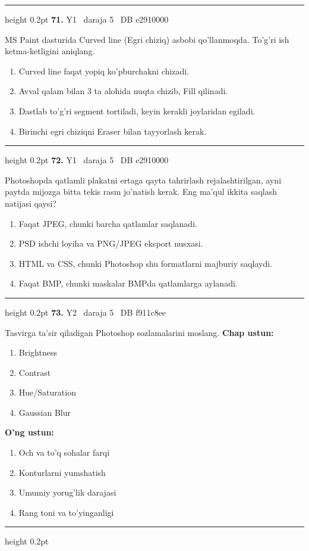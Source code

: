 \documentclass[10pt,a4paper,oneside]{article}
\begin{document}
\vspace{2mm}\hrule height 0.2pt \vspace{4mm}
\hypertarget{q71}{\textbf{\color{ink}71.}}  {\color{muted}\scriptsize Y1 \textbullet\ daraja 5 \textbullet\ DB e2910000}
\par
MS Paint dasturida Curved line (Egri chiziq) asbobi qo'llanmoqda. To'g'ri ish ketma-ketligini aniqlang.
\begin{enumerate}[label=\Alph*),leftmargin=9mm]
\item Curved line faqat yopiq ko'pburchakni chizadi.
\item Avval qalam bilan 3 ta alohida nuqta chizib, Fill qilinadi.
\item Dastlab to'g'ri segment tortiladi, keyin kerakli joylaridan egiladi.
\item Birinchi egri chiziqni Eraser bilan tayyorlash kerak.
\end{enumerate}
\vspace{2mm}\hrule height 0.2pt \vspace{4mm}
\hypertarget{q72}{\textbf{\color{ink}72.}}  {\color{muted}\scriptsize Y1 \textbullet\ daraja 5 \textbullet\ DB e2910000}
\par
Photoshopda qatlamli plakatni ertaga qayta tahrirlash rejalashtirilgan, ayni paytda mijozga bitta tekis rasm jo'natish kerak. Eng ma'qul ikkita saqlash natijasi qaysi?
\begin{enumerate}[label=\Alph*),leftmargin=9mm]
\item Faqat JPEG, chunki barcha qatlamlar saqlanadi.
\item PSD ishchi loyiha va PNG/JPEG eksport nusxasi.
\item HTML va CSS, chunki Photoshop shu formatlarni majburiy saqlaydi.
\item Faqat BMP, chunki maskalar BMPda qatlamlarga aylanadi.
\end{enumerate}
\vspace{2mm}\hrule height 0.2pt \vspace{4mm}
\hypertarget{q73}{\textbf{\color{ink}73.}}  {\color{muted}\scriptsize Y2 \textbullet\ daraja 5 \textbullet\ DB f911c8ee}
\par
Tasvirga ta'sir qiladigan Photoshop sozlamalarini moslang.
\textbf{\footnotesize Chap ustun:}
\begin{enumerate}[label=\arabic*),leftmargin=9mm]
\item Brightness
\item Contrast
\item Hue/Saturation
\item Gaussian Blur
\end{enumerate}
\textbf{\footnotesize O'ng ustun:}
\begin{enumerate}[label=\Alph*),leftmargin=9mm]
\item Och va to'q sohalar farqi
\item Konturlarni yumshatish
\item Umumiy yorug'lik darajasi
\item Rang toni va to'yinganligi
\end{enumerate}
\vspace{2mm}\hrule height 0.2pt \vspace{4mm}
\end{document}
